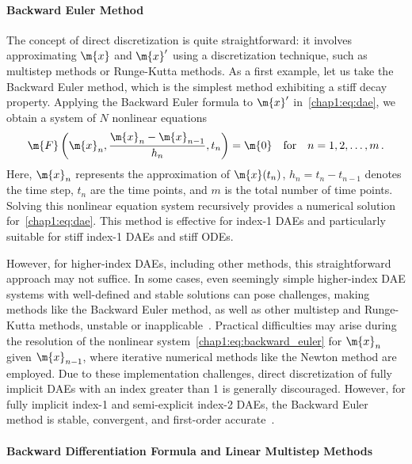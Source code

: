 \paragraph{Backward Euler Method}

The concept of direct discretization is quite straightforward: it involves approximating $\m{x}$ and $\m{x}^{\prime}$ using a discretization technique, such as multistep methods or Runge-Kutta methods. As a first example, let us take the Backward Euler method, which is the simplest method exhibiting a stiff decay property. Applying the Backward Euler formula to $\m{x}^{\prime}$ in~\eqref{chap1:eq:dae}, we obtain a system of $N$ nonlinear equations
%
\begin{equation}
  \m{F}\left(\m{x}_n, \dfrac{\m{x}_n - \m{x}_{n-1}}{h_n}, t_n\right) = \m{0} \quad \text{for} \quad n = 1, 2, \dots, m \, \text{.}
  \label{chap1:eq:backward_euler}
\end{equation}
%
Here, $\m{x}_n$ represents the approximation of $\m{x}(t_n)$, $h_n = t_n - t_{n-1}$ denotes the time step, $t_n$ are the time points, and $m$ is the total number of time points. Solving this nonlinear equation system recursively provides a numerical solution for~\eqref{chap1:eq:dae}. This method is effective for index-1 \acp{DAE} and particularly suitable for stiff index-1 \acp{DAE} and stiff \acp{ODE}.

However, for higher-index \acp{DAE}, including other methods, this straightforward approach may not suffice. In some cases, even seemingly simple higher-index \ac{DAE} systems with well-defined and stable solutions can pose challenges, making methods like the Backward Euler method, as well as other multistep and Runge-Kutta methods, unstable or inapplicable~\cite{ascher1998computer}. Practical difficulties may arise during the resolution of the nonlinear system~\eqref{chap1:eq:backward_euler} for $\m{x}_n$ given $\m{x}_{n-1}$, where iterative numerical methods like the Newton method are employed. Due to these implementation challenges, direct discretization of fully implicit \acp{DAE} with an index greater than 1 is generally discouraged. However, for fully implicit index-1 and semi-explicit index-2 \acp{DAE}, the Backward Euler method is stable, convergent, and first-order accurate~\cite{brenan1995numerical, hairer1999stiff}.

\paragraph{Backward Differentiation Formula and Linear Multistep Methods}

